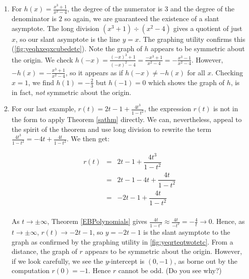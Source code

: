 \begin{ex}
\begin{enumerate}
\begin{mfigure}

 
\caption{The graph of $y=f(x)$}
\label{fig:yeqfxeqxsquaredetc}
\end{mfigure}

\begin{mfigure}
  

\caption{The graph of $y=g(t)$}
\label{fig:yeqgteqtsquaredetc}
\end{mfigure}

\item   For $h(x) = \frac{x^3+1}{x^2-4}$, the degree of the numerator is $3$ and the degree of the denominator is $2$ so again, we are guaranteed the existence of a slant asymptote.  The long division $\left(x^3+1 \right) \div \left(x^2-4\right)$ gives a quotient of just $x$, so our slant asymptote is the line $y=x$.  The graphing utility confirms this (\autoref{fig:yeqhxeqxcubedetc}).  Note the graph of $h$ appears to be symmetric about the origin.  We check $h(-x) = \frac{(-x)^3+1}{(-x)^2-4} = \frac{-x^3+1}{x^2-4} = - \frac{x^3-1}{x^2-4}$.  However, $-h(x) = - \frac{x^3+1}{x^2-4}$, so it appears as if $h(-x) \neq -h(x)$ for all $x$.  Checking $x=1$, we find $h(1) = -\frac{2}{3}$ but $h(-1) = 0$ which shows the graph of $h$, is in fact,  \textit{not} symmetric about the origin.

\item  For our last example,  $r(t) = 2t-1+\frac{4t^3}{1-t^2}$, the expression $r(t)$ is not in the form to apply Theorem \ref{sathm} directly.  We can, nevertheless, appeal to the spirit of the theorem and use long division to rewrite the term $\frac{4t^3}{1-t^2} = -4t + \frac{4t}{1-t^2}$.  We then get:

 \[ \begin{array}{rcl}
 
 r(t) & = & 2t-1+\dfrac{4t^3}{1-t^2} \\
       &= &  2t-1-4t+\dfrac{4t}{1-t^2} \\
       & = & -2t-1 + \dfrac{4t}{1-t^2} \\ \end{array}\]
       
As $t \rightarrow \pm \infty$,  Theorem \ref{EBPolynomials} gives  $\frac{4t}{1-t^2} \approx \frac{4t}{-t^2} = -\frac{4}{t} \rightarrow 0$.  Hence, as $t \rightarrow \pm \infty$, $r(t) \rightarrow -2t-1$, so $y = -2t-1$ is the slant asymptote to the graph as confirmed by the graphing utility in \autoref{fig:yeqrteqtwotetc}.  From a distance, the graph of $r$ appears to be symmetric about the origin.  However, if we look carefully, we see the $y$-intercept is $(0,-1)$, as borne out by the computation $r(0) = -1$.  Hence $r$ cannot be odd.  (Do you see why?)


\end{enumerate}
\end{ex}

